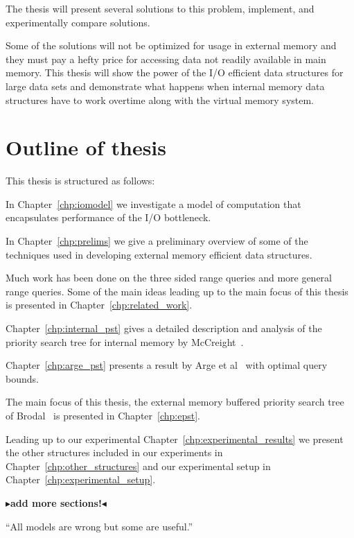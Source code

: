 \documentclass[twoside,11pt,openright]{report}
\newcommand{\todo}[1]{{\color[rgb]{.5,0,0}\textbf{$\blacktriangleright$#1$\blacktriangleleft$}}}
\begin{document}
The thesis will present several solutions to this problem, implement, and experimentally compare solutions.

Some of the solutions will not be optimized for usage in external memory and they must pay a hefty price for accessing data not readily available in main memory. This thesis will show the power of the I/O efficient data structures for large data sets and demonstrate what happens when internal memory data structures have to work overtime along with the virtual memory system.

\section{Outline of thesis}
This thesis is structured as follows:

In Chapter~\ref{chp:iomodel} we investigate a model of computation that encapsulates performance of the I/O bottleneck.

In Chapter~\ref{chp:prelims} we give a preliminary overview of some of the techniques used in developing external memory efficient data structures.

Much work has been done on the three sided range queries and more general range queries. Some of the main ideas leading up to the main focus of this thesis is presented in Chapter~\ref{chp:related_work}.


Chapter~\ref{chp:internal_pst} gives a detailed description and analysis of the priority search tree for internal memory by McCreight~\cite{DBLP:journals/siamcomp/McCreight85}.

Chapter~\ref{chp:arge_pst} presents a result by Arge et al~\cite{arge_samoladas_vitter_1999} with optimal query bounds.

The main focus of this thesis, the external memory buffered priority search tree of Brodal~\cite{DBLP:journals/corr/Brodal15} is presented in Chapter~\ref{chp:epst}.

Leading up to our experimental Chapter~\ref{chp:experimental_results} we present the other structures included in our experiments in Chapter~\ref{chp:other_structures} and our experimental setup in Chapter~\ref{chp:experimental_setup}.

\todo{add more sections!}



\begin{savequote}[0.5\textwidth]
``All models are wrong but some are useful.''
\end{savequote}
\end{document}
